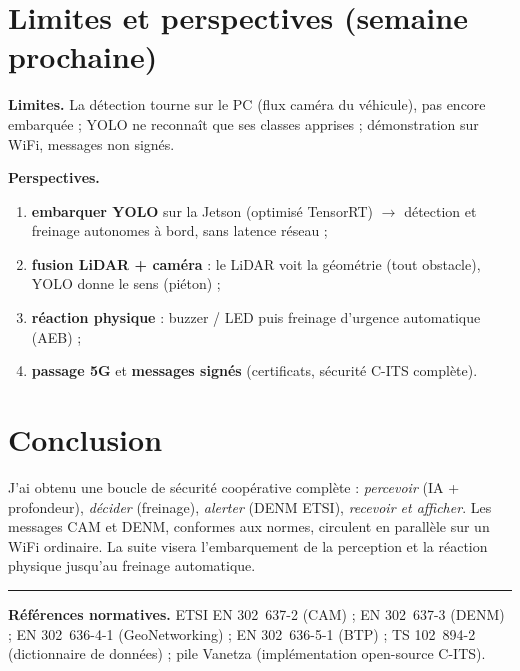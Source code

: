 \documentclass[a4paper,11pt]{article}
\begin{document}
\section{Limites et perspectives (semaine prochaine)}
\textbf{Limites.} La détection tourne sur le PC (flux caméra du véhicule), pas encore embarquée ;
YOLO ne reconnaît que ses classes apprises ; démonstration sur WiFi, messages non signés.

\textbf{Perspectives.}
\begin{enumerate}[leftmargin=1.5em, itemsep=1pt]
  \item \textbf{embarquer YOLO} sur la Jetson (optimisé TensorRT) $\to$ détection et freinage
        autonomes à bord, sans latence réseau ;
  \item \textbf{fusion LiDAR + caméra} : le LiDAR voit la géométrie (tout obstacle), YOLO donne le
        sens (piéton) ;
  \item \textbf{réaction physique} : buzzer / LED puis freinage d'urgence automatique (AEB) ;
  \item \textbf{passage 5G} et \textbf{messages signés} (certificats, sécurité C-ITS complète).
\end{enumerate}

\section{Conclusion}
J'ai obtenu une boucle de sécurité coopérative complète : \emph{percevoir} (IA + profondeur),
\emph{décider} (freinage), \emph{alerter} (DENM ETSI), \emph{recevoir et afficher}. Les messages
CAM et DENM, conformes aux normes, circulent en parallèle sur un WiFi ordinaire. La suite visera
l'embarquement de la perception et la réaction physique jusqu'au freinage automatique.

\vspace{4pt}\hrule
{\footnotesize\textbf{Références normatives.} ETSI EN 302~637-2 (CAM) ; EN 302~637-3 (DENM) ;
EN 302~636-4-1 (GeoNetworking) ; EN 302~636-5-1 (BTP) ; TS 102~894-2 (dictionnaire de données) ;
pile Vanetza (implémentation open-source C-ITS).}
\end{document}
